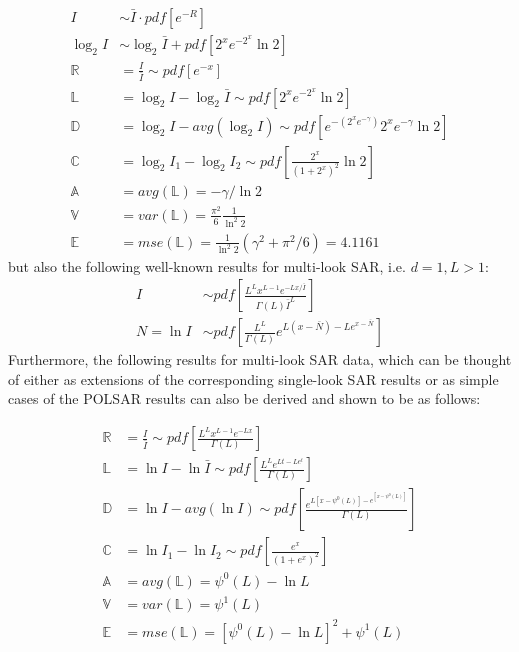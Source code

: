 {\footnotesize
\begin{align}  
  I &\sim \bar{I} \cdot pdf \left[ e^{-R} \right] \\
  \log_2{I} &\sim \log_2{\bar{I}} + pdf \left[ 2^xe^{-2^x}\ln2 \right] \\
  \mathbb{R} &= \frac{I}{\bar{I}} \sim pdf \left[ e^{-x} \right]  \\
  \mathbb{L} &= \log_2{I} - \log_2{\bar{I}} \sim pdf \left[ 2^xe^{-2^x}\ln2 \right]\\
  \mathbb{D} &= \log_2{I} - avg(\log_2{I}) \sim pdf \left[ e^{-(2^xe^{-\gamma})} 2^xe^{-\gamma} \ln2 \right] \\
  \mathbb{C} &= \log_2{I_1} - \log_2{I_2} \sim pdf \left[ \frac{2^x}{(1+2^x)^2} \ln2 \right] \\
  \mathbb{A} &= avg(\mathbb{L}) = -\gamma / \ln{2} \\
  \mathbb{V} &= var(\mathbb{L}) = \frac{\pi^2}{6} \frac{1}{ \ln^2{2}} \\
  \mathbb{E} &= mse(\mathbb{L}) = \frac{1}{\ln^2{2}}( \gamma^2 + \pi^2/6 ) = 4.1161 
\end{align}
}%
but also the following well-known results for multi-look SAR, i.e. $d=1,L>1$:
  \begin{align}
I &\sim pdf \left[ \frac{L^L x^{L-1} e^{-Lx/\bar{I}}}{\Gamma(L) \bar{I}^L} \right] \\
N = \ln{I} &\sim pdf \left[ \frac{L^L}{\Gamma(L)} e^{L(x-\bar{N})-Le^{x-\bar{N}}} \right]
  \end{align}
Furthermore, the following results for multi-look SAR data, which can be thought of
either as extensions of the corresponding single-look SAR results or as simple cases of
the POLSAR results can also be derived and shown to be as follows:

  \begin{align}
    \mathbb{R} &= \frac{I}{\bar{I}} \sim pdf \left[ \frac{ L^{L} x^{L-1} e^{-Lx}}{ \Gamma(L)} \label{eqn:multi_look_SAR_ratio_dist} \right]\\
    \mathbb{L} &= \ln{I} - \ln{\bar{I}} \sim pdf \left[ \frac{L^Le^{Lt-Le^t}}{ \Gamma(L)}  \right] \\
    \mathbb{D} &= \ln{I} - avg(\ln{I}) \sim pdf \left[ \frac{e^{L[x-\psi^0(L)]-e^{[x-\psi^0(L)]}}}{\Gamma(L)} \right] \\
    \mathbb{C} &= \ln{I_1} - \ln{I_2} \sim pdf \left[ \frac{e^{x}}{(1+e^x)^{2}} \right] \\
    \mathbb{A} &= avg(\mathbb{L}) = \psi^0(L) - \ln{L} \\
    \mathbb{V} &= var(\mathbb{L}) = \psi^1(L) \\
    \mathbb{E} &= mse(\mathbb{L}) = \left[ \psi^0(L) - \ln{L} \right]^2 + \psi^1(L)
  \end{align}

